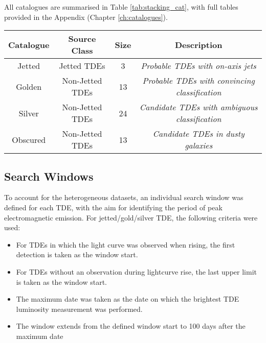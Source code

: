 All catalogues are summarised in Table \ref{tab:stacking_cat}, with full tables provided in the Appendix (Chapter \ref{ch:catalogues}).

\begin{table*}[]
	\centering
	\begin{tabular}{||c c c c |} 
		\hline
		Catalogue & Source Class & Size & Description \\ [0.5ex] 
		\hline\hline
		Jetted & Jetted TDEs &  3 & \textit{Probable TDEs with on-axis jets}\\ 
		\hline
		Golden & Non-Jetted TDEs & 13 & \textit{Probable TDEs with convincing classification}\\
		\hline
		Silver & Non-Jetted TDEs & 24 & \textit{Candidate TDEs with ambiguous classification}\\
		\hline
		Obscured & Non-Jetted TDEs & 13 & \textit{Candidate TDEs in dusty galaxies}\\[1ex] 
		\hline
	\end{tabular}
	\caption{Summary of the four TDE catalogues..}
	\label{tab:stacking_cat}
\end{table*}{}

\subsection{Search Windows}

To account for the heterogeneous datasets, an individual search window was defined for each TDE, with the aim for identifying the period of peak electromagnetic emission. For jetted/gold/silver TDE, the following criteria were used:

\begin{itemize}
	\item For TDEs in which the light curve was observed when rising, the first detection is taken as the window start.
	
	\item For TDEs without an observation during lightcurve rise, the last upper limit is taken as the window start.
	
	\item The maximum date was taken as the date on which the brightest TDE luminosity measurement was performed.
	
	\item The window extends from the defined window start to 100 days after the maximum date
	
\end{itemize}

